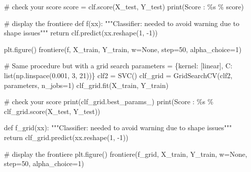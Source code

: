 \documentclass[
  12pt,
  letterpaper,
  DIV=11,
  numbers=noendperiod]{scrartcl}
\newenvironment{Shaded}{\begin{snugshade}}{\end{snugshade}}
\newcommand{\BuiltInTok}[1]{\textcolor[rgb]{0.00,0.23,0.31}{#1}}
\newcommand{\CommentTok}[1]{\textcolor[rgb]{0.37,0.37,0.37}{#1}}
\newcommand{\ControlFlowTok}[1]{\textcolor[rgb]{0.00,0.23,0.31}{#1}}
\newcommand{\DecValTok}[1]{\textcolor[rgb]{0.68,0.00,0.00}{#1}}
\newcommand{\FloatTok}[1]{\textcolor[rgb]{0.68,0.00,0.00}{#1}}
\newcommand{\KeywordTok}[1]{\textcolor[rgb]{0.00,0.23,0.31}{#1}}
\newcommand{\NormalTok}[1]{\textcolor[rgb]{0.00,0.23,0.31}{#1}}
\newcommand{\OperatorTok}[1]{\textcolor[rgb]{0.37,0.37,0.37}{#1}}
\newcommand{\SpecialCharTok}[1]{\textcolor[rgb]{0.37,0.37,0.37}{#1}}
\newcommand{\StringTok}[1]{\textcolor[rgb]{0.13,0.47,0.30}{#1}}
\newcommand{\VariableTok}[1]{\textcolor[rgb]{0.07,0.07,0.07}{#1}}
\begin{document}
\begin{Shaded}
\begin{Highlighting}[]
\CommentTok{\# check your score}
\NormalTok{score }\OperatorTok{=}\NormalTok{ clf.score(X\_test, Y\_test)}
\BuiltInTok{print}\NormalTok{(}\StringTok{\textquotesingle{}Score : }\SpecialCharTok{\%s}\StringTok{\textquotesingle{}} \OperatorTok{\%}\NormalTok{ score)}

\CommentTok{\# display the frontiere}
\KeywordTok{def}\NormalTok{ f(xx):}
    \CommentTok{"""Classifier: needed to avoid warning due to shape issues"""}
    \ControlFlowTok{return}\NormalTok{ clf.predict(xx.reshape(}\DecValTok{1}\NormalTok{, }\OperatorTok{{-}}\DecValTok{1}\NormalTok{))}

\NormalTok{plt.figure()}
\NormalTok{frontiere(f, X\_train, Y\_train, w}\OperatorTok{=}\VariableTok{None}\NormalTok{, step}\OperatorTok{=}\DecValTok{50}\NormalTok{, alpha\_choice}\OperatorTok{=}\DecValTok{1}\NormalTok{)}

\CommentTok{\# Same procedure but with a grid search}
\NormalTok{parameters }\OperatorTok{=}\NormalTok{ \{}\StringTok{\textquotesingle{}kernel\textquotesingle{}}\NormalTok{: [}\StringTok{\textquotesingle{}linear\textquotesingle{}}\NormalTok{], }\StringTok{\textquotesingle{}C\textquotesingle{}}\NormalTok{: }\BuiltInTok{list}\NormalTok{(np.linspace(}\FloatTok{0.001}\NormalTok{, }\DecValTok{3}\NormalTok{, }\DecValTok{21}\NormalTok{))\}}
\NormalTok{clf2 }\OperatorTok{=}\NormalTok{ SVC()}
\NormalTok{clf\_grid }\OperatorTok{=}\NormalTok{ GridSearchCV(clf2, parameters, n\_jobs}\OperatorTok{=}\DecValTok{1}\NormalTok{)}
\NormalTok{clf\_grid.fit(X\_train, Y\_train)}

\CommentTok{\# check your score}
\BuiltInTok{print}\NormalTok{(clf\_grid.best\_params\_)}
\BuiltInTok{print}\NormalTok{(}\StringTok{\textquotesingle{}Score : }\SpecialCharTok{\%s}\StringTok{\textquotesingle{}} \OperatorTok{\%}\NormalTok{ clf\_grid.score(X\_test, Y\_test))}

\KeywordTok{def}\NormalTok{ f\_grid(xx):}
    \CommentTok{"""Classifier: needed to avoid warning due to shape issues"""}
    \ControlFlowTok{return}\NormalTok{ clf\_grid.predict(xx.reshape(}\DecValTok{1}\NormalTok{, }\OperatorTok{{-}}\DecValTok{1}\NormalTok{))}

\CommentTok{\# display the frontiere}
\NormalTok{plt.figure()}
\NormalTok{frontiere(f\_grid, X\_train, Y\_train, w}\OperatorTok{=}\VariableTok{None}\NormalTok{, step}\OperatorTok{=}\DecValTok{50}\NormalTok{, alpha\_choice}\OperatorTok{=}\DecValTok{1}\NormalTok{)}
\end{Highlighting}
\end{Shaded}
\end{document}
